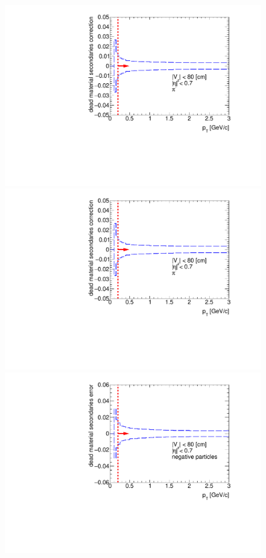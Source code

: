 \begin{figure}[hb]
{  \includegraphics[width=\linewidth,page=5]{graphics/systematicsEfficiency/deadMaterial/secondaries_Unbinned_CD_1D.pdf}\\
  \includegraphics[width=\linewidth,page=6]{graphics/systematicsEfficiency/deadMaterial/secondaries_Unbinned_CD_1D.pdf}\\
  \includegraphics[width=\linewidth,page=2]{graphics/systematicsEfficiency/deadMaterial/secondaries_Unbinned_Charged_CD1D.pdf}
}%
\end{figure}



